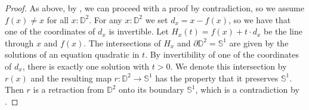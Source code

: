 \begin{proof}
  As above, by , we can proceed with a proof by contradiction,
  so we assume $f(x)\neq x$ for all $x:\mathbb{D}^2$.
  For any $x:\mathbb{D}^2$ we set $d_x= x-f(x)$, so we have that one of the coordinates of $d_x$ is invertible.
  Let $H_x(t) = f(x) + t\cdot d_x $ be the line through $x$ and $f(x)$.
  The intersections of $H_x$ and $\partial\mathbb{D}^2=\mathbb{S}^1$ are given by the solutions of an equation quadratic in $t$. By invertibility of one of the coordinates of $d_x$, there is exactly one solution with $t> 0$.
  We denote this intersection by $r(x)$ and the resulting map $r:\mathbb D^2\to\mathbb S^1$ has the property that it preserves $\mathbb{S}^1$.
  Then $r$ is a retraction from $\mathbb{D}^2$ onto its boundary $\mathbb{S}^1$, which is a contradiction by .
\end{proof}

